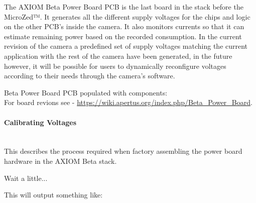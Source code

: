 The AXIOM Beta Power Board PCB is the last board in the stack before the MicroZed™. It generates all the different supply voltages for the chips and logic on the other PCB’s inside the camera. It also monitors currents so that it can estimate remaining power based on the recorded consumption. In the current revision of the camera a predefined set of supply voltages matching the current application with the rest of the camera have been generated, in the future however, it will be possible for users to dynamically reconfigure voltages according to their needs through the camera’s software. 



Beta Power Board PCB populated with components:\\





For board revions see - \href{https://wiki.apertus.org/index.php/Beta_Power_Board}{https://wiki.apertus.org/index.php/Beta\_Power\_Board}.\\


\paragraph{Calibrating Voltages}\mbox{}\\

This describes the process required when factory assembling the power board hardware in the AXIOM Beta stack.\\



Wait a little...\\


This will output something like: 

